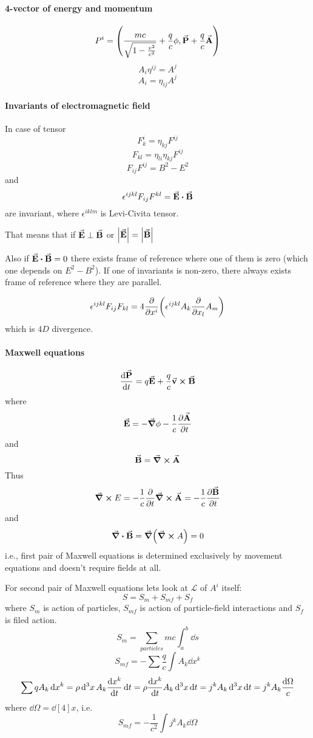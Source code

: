 \paragraph{4-vector of energy and momentum}
$$P^i = \qty(\frac{mc}{\sqrt{1-\frac{v^2}{c^2}}} +\frac{q}{c}\phi, \va{P} + \frac{q}{c}\va{A})$$
$$A_{i}\eta^{ij} = A^j$$
$$A_i = \eta_{ij}A^j$$
\paragraph{Invariants of electromagnetic field}
In case of tensor
$$F_k^i = \eta_{kj}F^{ij}$$
$$F_{kl} = \eta_{li}\eta_{kj}F^{ij}$$
$$F_{ij}F^{ij} = B^2-E^2$$
and
$$\epsilon^{ijkl}F_{ij}F^{kl} = \va{E} \vdot \va{B}$$
are invariant, where $\epsilon^{iklm}$ is Levi-Civita tensor.

That means that if $\va{E} \perp \va{B}$ or $\abs{\va{E}} = \abs{\va{B}}$

Also if $\va{E} \vdot \va{B} = 0$ there exists frame of reference where one of them is zero (which one depends on $E^2-B^2$). If one of invariants is non-zero, there always exists frame of reference where they are parallel.

$$\epsilon^{ijkl}F_{ij}F_{kl} = 4 \pdv{x^i} \qty(\epsilon^{ijkl}A_k \pdv{x_l} A_m)$$
which is $4D$ divergence. 

\paragraph{Maxwell equations}
$$\dv{\va{P}}{t} = q\va{E} + \frac{q}{c} \va{v} \cross \va{B}$$
where
$$\va{E} = -\grad{\phi} - \frac{1}{c} \pdv{\va{A}}{t}$$ 
and
$$\va{B} = \curl{\va{A}}$$
Thus
$$\curl{E} = -\frac{1}{c} \pdv{t} \curl{\va{A}} = -\frac{1}{c} \pdv{\va{B}}{t}$$
and
$$\div{\va{B}} = \grad(\curl{A}) = 0$$
i.e., first pair of Maxwell equations is determined exclusively by movement equations and doesn't require fields at all.

For second pair of Maxwell equations lets look at $\mathcal{L}$ of $A^i$ itself:
$$S = S_m+S_{mf}+S_f$$
where $S_m$ is action of particles, $S_{mf}$ is action of particle-field interactions and $S_f$ is filed action.
$$S_m = \sum_{particles} mc \int_a^b \dd{s}$$
$$S_{mf} = -\sum \frac{q}{c} \int A_k \dd{x^k}$$
$$\sum q A_k \dd{x^k} = \rho \dd[3]{x} A_k \dv{x^k}{t} \dd{t} = \rho \dv{x^k}{t} A_k \dd[3]{x} \dd{t} = j^k A_k \dd[3]{x} \dd{t} = j^k A_k \frac{\dd{\Omega}}{c}$$
where $\dd{\Omega} = \dd[4]{x}$, i.e.
$$S_{mf} = -\frac{1}{c^2} \int j^k A_k \dd{\Omega}$$
